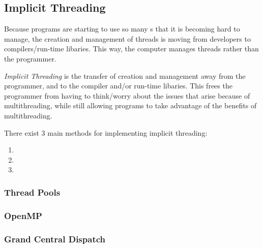 \subsection{Implicit Threading}\label{subsec:Implicit_Threading}
Because programs are starting to use so many s that it is becoming hard to manage, the creation and management of threads is moving from developers to compilers/run-time libaries.
This way, the computer manages threads rather than the programmer.

\begin{definition}\label{def:Implicit_Threading}
  \emph{Implicit Threading} is the transfer of  creation and management away from the programmer, and to the compiler and/or run-time libaries.
  This frees the programmer from having to think/worry about the issues that arise because of multithreading, while still allowing programs to take advantage of the benefits of multithreading.
\end{definition}

There exist 3 main methods for implementing implicit threading:
\begin{enumerate}[noitemsep]
\item {}
\item {}
\item {}
\end{enumerate}

\subsubsection{Thread Pools}\label{subsubsec:Thread_Pools}
\subsubsection{OpenMP}\label{subsubsec:OpenMP}
\subsubsection{Grand Central Dispatch}\label{subsubsec:Grand_Central_Dispatch}
